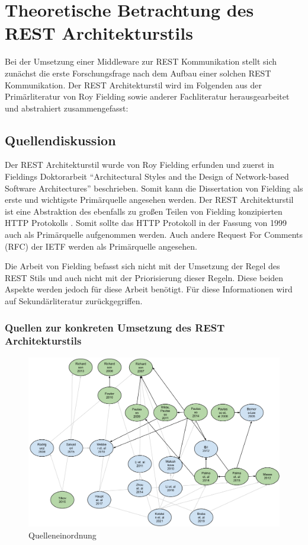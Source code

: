 \chapter{Theoretische Betrachtung des REST Architekturstils}\label{chapter:theoretische-betrachtung}

Bei der Umsetzung einer Middleware zur REST Kommunikation stellt sich zunächst die erste Forschungsfrage nach dem Aufbau einer solchen REST Kommunikation. Der REST Architekturstil wird im Folgenden aus der Primärliteratur von Roy Fielding sowie anderer Fachliteratur herausgearbeitet und abstrahiert zusammengefasst:

\section{Quellendiskussion}\label{section:quellendiskussion}

Der REST Architekturstil wurde von Roy Fielding erfunden und zuerst in Fieldings Doktorarbeit “Architectural Styles and the Design of Network-based Software Architectures” beschrieben. Somit kann die Dissertation von Fielding als erste und wichtigste Primärquelle angesehen werden. Der REST Architekturstil ist eine Abstraktion des ebenfalls zu großen Teilen von Fielding konzipierten HTTP Protokolls . Somit sollte das HTTP Protokoll in der Fassung von 1999 auch als Primärquelle aufgenommen werden. Auch andere Request For Comments (RFC) der IETF werden als Primärquelle angesehen. 

Die Arbeit von Fielding befasst sich nicht mit der Umsetzung der Regel des REST Stils und auch nicht mit der Priorisierung dieser Regeln. Diese beiden Aspekte werden jedoch für diese Arbeit benötigt. Für diese Informationen wird auf Sekundärliteratur zurückgegriffen. 

\subsection{Quellen zur konkreten Umsetzung des REST Architekturstils}\label{subsection:qullen-zur-konkreten-umsetzung}

\begin{figure}[htb]
\centering
\includegraphics[width=\textwidth]{graphics/quelleneinordnung.png}
\caption[quelleneinordnung]{Quelleneinordnung}
\label{abb:QuellenEinordnung}
\end{figure}


